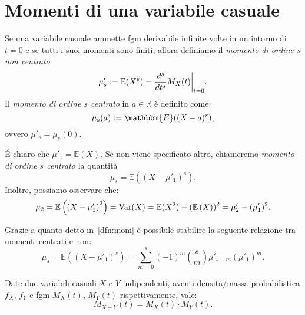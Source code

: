 \section{Momenti di una variabile casuale}

\begin{dfn}\label{dfn:mom}
Se una variabile casuale ammette fgm derivabile infinite volte in un intorno di \(t=0\) e se tutti i suoi momenti sono finiti, allora definiamo il \emph{momento di ordine \(s\) non centrato}: 
\begin{equation}
  \mu'_s := \mathbb{E}(X^s) = \restr{\frac{d^s}{dt^s} M_X(t)}{t=0}.
\end{equation} 
Il \emph{momento di ordine \(s\) centrato} in \(a \in \mathbb{R}\) è definito come: 
\begin{equation}
  \mu_s (a) := \mathbbm{E} ((X-a)^s),
\end{equation}
ovvero $\mu'_s = \mu_s (0)$.

\end{dfn}

\begin{oss}
  \'E chiaro che \(\mu'_1 = \mathbb{E}(X)\). Se non viene specificato altro, chiameremo \emph{momento di ordine \(s\) centrato} la quantità
  \begin{equation}
    \mu_s = \mathbb{E}((X-\mu'_1)^s).
  \end{equation}
  Inoltre, possiamo osservare che:
  \begin{equation*}
    \mu_2 = \mathbb{E} \left({\left(X-\mu'_1\right)}^2\right) 
          = \operatorname{Var}(X) 
          = \mathbb{E} (X^2) - \left(\mathbb{E} \left(X\right)\right)^2
          = \mu'_2 - (\mu'_1)^2.
  \end{equation*}
\end{oss}
\begin{oss}
  Grazie a quanto detto in~\ref{dfn:mom} è possibile stabilire la seguente relazione tra momenti centrati e non:
  \begin{equation}
    \mu_s = \mathbb{E} \left({\left(X-\mu'_1\right)}^s\right) =
            \sum_{m=0}^s (-1)^m \binom{s}{m} \mu'_{s-m} (\mu'_1)^m.
  \end{equation}
\end{oss}

\begin{thm}
Date due variabili casuali \(X\) e \(Y\) indipendenti, aventi densità/massa probabilistica \(f_X\), \(f_Y\) e fgm \(M_X(t)\), \(M_Y(t)\) rispettivamente,
vale:
\begin{equation}
  M_{X+Y}(t) = M_X(t) \cdot M_Y(t).
\end{equation}
\end{thm}

